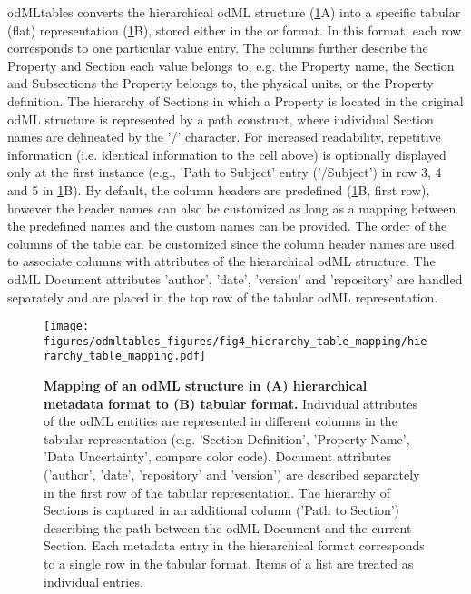odMLtables converts the hierarchical odML structure (\cref{fig:tree_and_table}A) into a specific tabular (flat) representation (\cref{fig:tree_and_table}B), stored either in the  or  format. In this format, each row corresponds to one particular value entry. The columns further describe the Property and Section each value belongs to, e.g. the Property name, the Section and Subsections the Property belongs to, the physical units, or the Property definition. The hierarchy of Sections in which a Property is located in the original odML structure is represented by a path construct, where individual Section names are delineated by the '/' character. For increased readability, repetitive information (i.e. identical information to the cell above) is optionally displayed only at the first instance (e.g., 'Path to Subject' entry ('/Subject') in row 3, 4 and 5 in \cref{fig:tree_and_table}B). By default, the  column headers are predefined (\cref{fig:tree_and_table}B, first row), however the header names can also be customized as long as a mapping between the predefined names and the custom names can be provided. The order of the columns of the table can be customized since the column header names are used to associate columns with attributes of the hierarchical odML structure. The odML Document attributes 'author', 'date', 'version' and 'repository' are handled separately and are placed in the top row of the tabular odML representation.

\begin{figure}[!ht]
\begin{center}
\texttt{[image: figures/odmltables\_figures/fig4\_hierarchy\_table\_mapping/hierarchy\_table\_mapping.pdf]}
\caption[Mapping of an odML structure in (A) hierarchical metadata format to (B) tabular format.]{{\label{fig:tree_and_table}
\textbf{Mapping of an odML structure in (A) hierarchical metadata format to (B) tabular format.} Individual attributes of the odML entities are represented in different columns in the tabular representation (e.g. 'Section Definition', 'Property Name', 'Data Uncertainty', compare color code). Document attributes ('author', 'date', 'repository' and 'version') are described separately in the first row of the tabular representation. The hierarchy of Sections is captured in an additional column ('Path to Section') describing the path between the odML Document and the current Section. Each metadata entry in the hierarchical format corresponds to a single row in the tabular format. Items of a list are treated as individual entries.
}}
\end{center}
\end{figure}

